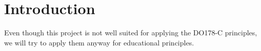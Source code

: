 \section{Introduction}



Even though this project is not well suited for applying the DO178-C principles, we will try to apply them anyway for educational principles.


\newpage

